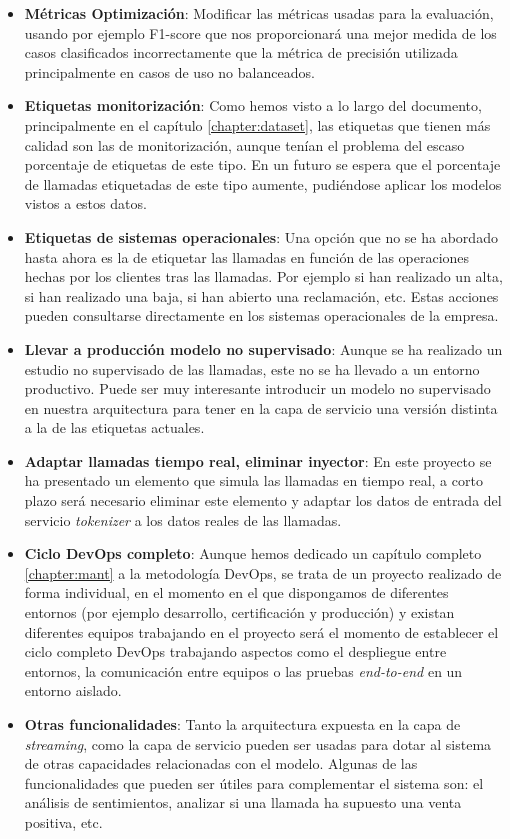 \begin{itemize}
	\item \textbf{Métricas Optimización}: Modificar las métricas usadas para la evaluación, usando por ejemplo F1-score que nos proporcionará una mejor medida de los casos clasificados incorrectamente que la métrica de precisión utilizada principalmente en casos de uso no balanceados.
	
	
	\item \textbf{Etiquetas monitorización}: Como hemos visto a lo largo del documento, principalmente en el capítulo \ref{chapter:dataset}, las etiquetas que tienen más calidad son las de monitorización, aunque tenían el problema del escaso porcentaje de etiquetas de este tipo. En un futuro se espera que el porcentaje de llamadas etiquetadas de este tipo aumente, pudiéndose aplicar los modelos vistos a estos datos.
	\item \textbf{Etiquetas de sistemas operacionales}: Una opción que no se ha abordado hasta ahora es la de etiquetar las llamadas en función de las operaciones hechas por los clientes tras las llamadas. Por ejemplo si han realizado un alta, si han realizado una baja, si han abierto una reclamación, etc. Estas acciones pueden consultarse directamente en los sistemas operacionales de la empresa.
	\item \textbf{Llevar a producción modelo no supervisado}: Aunque se ha realizado un estudio no supervisado de las llamadas, este no se ha llevado a un entorno productivo. Puede ser muy interesante introducir un modelo no supervisado en nuestra arquitectura para tener en la capa de servicio una versión distinta a la de las etiquetas actuales. 
	\item \textbf{Adaptar llamadas tiempo real, eliminar inyector}: En este proyecto se ha presentado un elemento que simula las llamadas en tiempo real, a corto plazo será necesario eliminar este elemento y adaptar los datos de entrada del servicio \textit{tokenizer} a los datos reales de las llamadas. 
	
	\item \textbf{Ciclo DevOps completo}: Aunque hemos dedicado un capítulo completo \ref{chapter:mant} a la metodología DevOps, se trata de un proyecto realizado de forma individual, en el momento en el que dispongamos de diferentes entornos (por ejemplo desarrollo, certificación y producción) y existan diferentes equipos trabajando en el proyecto será el momento de establecer el ciclo completo DevOps trabajando aspectos como el despliegue entre entornos, la comunicación entre equipos o las pruebas \textit{end-to-end} en un entorno aislado.
	
	
	\item \textbf{Otras funcionalidades}: Tanto la arquitectura expuesta en la capa de \textit{streaming}, como la capa de servicio pueden ser usadas para dotar al sistema de otras capacidades relacionadas con el modelo. Algunas de las funcionalidades que pueden ser útiles para complementar el sistema son: el análisis de sentimientos, analizar si una llamada ha supuesto una venta positiva, etc. 


\end{itemize}


